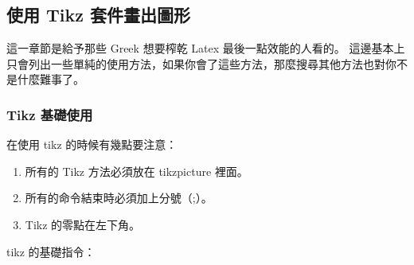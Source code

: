 \subsection{使用 Tikz 套件畫出圖形}

這一章節是給予那些 Greek 想要榨乾 Latex 最後一點效能的人看的。
這邊基本上只會列出一些單純的使用方法，如果你會了這些方法，那麼搜尋其他方法也對你不是什麼難事了。

\subsubsection{Tikz 基礎使用}

在使用 tikz 的時候有幾點要注意：
\begin{enumerate}
	\item 所有的 Tikz 方法必須放在 tikzpicture 裡面。
	\item 所有的命令結束時必須加上分號（;）。
	\item Tikz 的零點在左下角。
\end{enumerate}

tikz 的基礎指令：

